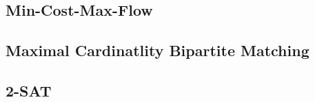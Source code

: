 \subsection{Min-Cost-Max-Flow}


\subsection{Maximal Cardinatlity Bipartite Matching}\label{kuhn}



\subsection{2-SAT}


% 

% 

